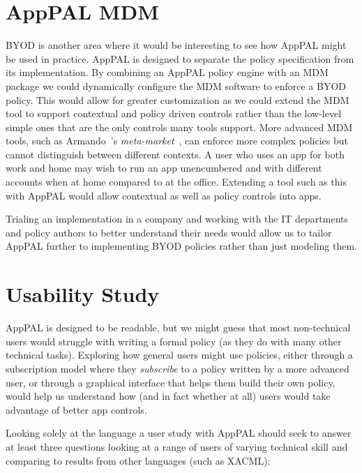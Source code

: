 \documentclass[thesis.tex]{subfiles}
\begin{document}
\section{AppPAL MDM}

BYOD is another area where it would be interesting to see how AppPAL might be
used in practice. AppPAL is designed to separate the policy specification from
its implementation. By combining an AppPAL policy engine with an MDM package we
could dynamically configure the MDM software to enforce a BYOD policy. This
would allow for greater customization as we could extend the MDM tool to support
contextual and policy driven controls rather than the low-level simple ones that
are the only controls many tools support. More advanced MDM tools, such as
Armando~\etal's \emph{meta-market}~\cite{armando_enabling_2014}, can enforce
more complex policies but cannot distinguish between different contexts. A user
who uses an app for both work and home may wish to run an app unencumbered and
with different accounts when at home compared to at the office. Extending a tool
such as this with AppPAL would allow contextual as well as policy controls into
apps.

Trialing an implementation in a company and working with the IT departments and
policy authors to better understand their needs would allow us to tailor AppPAL
further to implementing BYOD policies rather than just modeling them.

\section{Usability Study}

AppPAL is designed to be readable, but we might guess that most non-technical
users would struggle with writing a formal policy (as they do with many other
technical tasks). Exploring how general users might use policies, either through
a subscription model where they \emph{subscribe} to a policy written by a more
advanced user, or through a graphical interface that helps them build their own
policy, would help us understand how (and in fact whether at all) users would
take advantage of better app controls.

Looking solely at the language a user study with AppPAL should seek to answer at
least three questions looking at a range of users of varying technical skill and
comparing to results from other languages (such as XACML):
\end{document}
